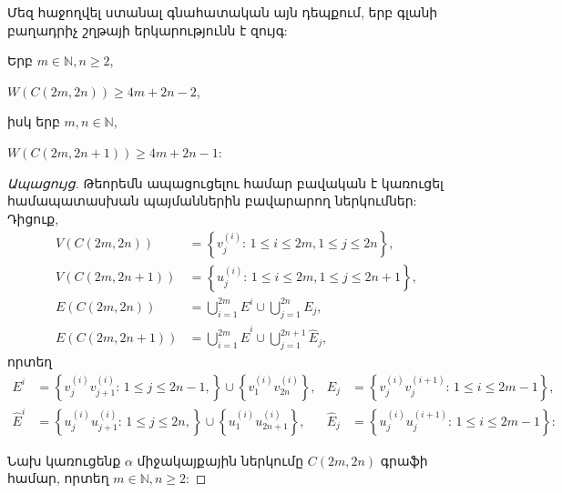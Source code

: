 Մեզ հաջողվել ստանալ գնահատական այն դեպքում, երբ գլանի բաղադրիչ շղթայի երկարությունն է զույգ:
\begin{theorem}
\label{t2_cylinder_W_evenpath} Երբ $m\in\mathbb{N},n\geq 2$, 
\begin{center}
$W(C(2m,2n))\geq 4m+2n-2$,
\end{center}
իսկ երբ $m,n\in\mathbb{N}$,
\begin{center}
$W(C(2m,2n+1))\geq 4m+2n-1$:
\end{center}
\end{theorem}
\begin{proof}[Ապացույց] Թեորեմն ապացուցելու համար բավական է կառուցել համապատասխան պայմաններին բավարարող ներկումներ: Դիցուք, 
\begin{align*}
V(C(2m,2n))&=\left\{v_{j}^{(i)}\colon\,1\leq i\leq 2m,1\leq j\leq 2n\right\},\\
V(C(2m,2n+1))&=\left\{u_{j}^{(i)}\colon\,1\leq i\leq 2m,1\leq j\leq 2n+1\right\},\\
E(C(2m,2n))&=\bigcup_{i=1}^{2m}E^{i}\cup \bigcup_{j=1}^{2n}E_{j}, \\
E(C(2m,2n+1))&=\bigcup_{i=1}^{2m}\hat{E}^{i}\cup \bigcup_{j=1}^{2n+1}\hat{E}_{j},
\end{align*}
որտեղ 
\begin{align*}
E^{i}&=\left\{v_{j}^{(i)}v_{j+1}^{(i)}\colon\,1\leq j\leq
2n-1,\right\}\cup \left\{v_{1}^{(i)}v_{2n}^{(i)}\right\},
&E_{j}&=\left\{v_{j}^{(i)}v_{j}^{(i+1)}\colon\,1\leq i\leq
2m-1\right\},\\
\hat{E}^{i}&=\left\{u_{j}^{(i)}u_{j+1}^{(i)}\colon\,1\leq j\leq
2n,\right\}\cup \left\{u_{1}^{(i)}u_{2n+1}^{(i)}\right\},
&\hat{E}_{j}&=\left\{u_{j}^{(i)}u_{j}^{(i+1)}\colon\,1\leq i\leq
2m-1\right\}:
\end{align*}

Նախ կառուցենք $\alpha$ միջակայքային ներկումը $C(2m,2n)$ գրաֆի համար, որտեղ $m\in\mathbb{N},n\geq 2$:


\end{proof}
